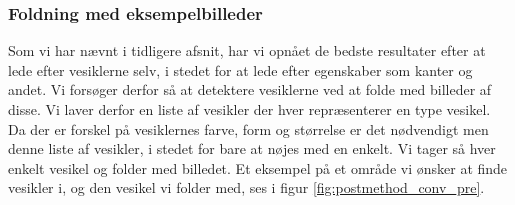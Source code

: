 \subsubsection{Foldning med eksempelbilleder}
Som vi har nævnt i tidligere afsnit, har vi opnået de bedste resultater efter at lede efter vesiklerne selv, i stedet for at lede efter egenskaber som kanter og andet. Vi forsøger derfor så at detektere vesiklerne ved at folde med billeder af disse. Vi laver derfor en liste af vesikler der hver repræsenterer en type vesikel. Da der er forskel på vesiklernes farve, form og størrelse er det nødvendigt men denne liste af vesikler, i stedet for bare at nøjes med en enkelt. Vi tager så hver enkelt vesikel og folder med billedet. Et eksempel på et område vi ønsker at finde vesikler i, og den vesikel vi folder med, ses i figur \ref{fig:postmethod_conv_pre}.

